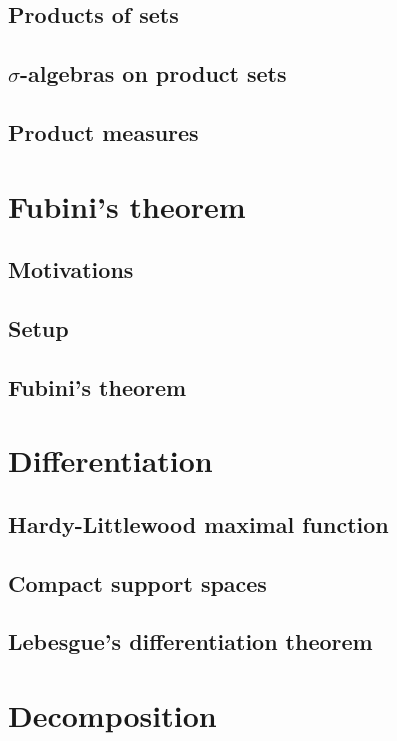\documentclass[../Year2.tex]{subfiles}
\begin{document}
\subsection{Products of sets}

\subsection{\texorpdfstring{$\sigma$}{o}-algebras on product sets}

\subsection{Product measures}

\section{Fubini's theorem}

\subsection{Motivations}

\subsection{Setup}

\subsection{Fubini's theorem}

\section{Differentiation}

\subsection{Hardy-Littlewood maximal function}

\subsection{Compact support spaces}

\subsection{Lebesgue's differentiation theorem}

\section{Decomposition}
\end{document}
